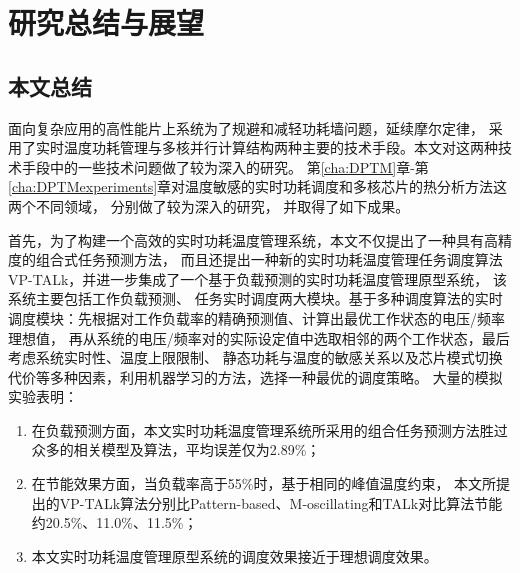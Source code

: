 

\chapter{研究总结与展望}
\label{cha:Conclusion}

\section{本文总结}
面向复杂应用的高性能片上系统为了规避和减轻功耗墙问题，延续摩尔定律， 采用了实时温度功耗管理与多核并行计算结构两种主要的技术手段。本文对这两种技术手段中的一些技术问题做了较为深入的研究。
第\ref{cha:DPTM}章-第\ref{cha:DPTMexperiments}章对温度敏感的实时功耗调度和多核芯片的热分析方法这两个不同领域， 分别做了较为深入的研究， 并取得了如下成果。

首先，为了构建一个高效的实时功耗温度管理系统，本文不仅提出了一种具有高精度的组合式任务预测方法， 而且还提出一种新的实时功耗温度管理任务调度算法VP-TALk，并进一步集成了一个基于负载预测的实时功耗温度管理原型系统， 该系统主要包括工作负载预测、 任务实时调度两大模块。基于多种调度算法的实时调度模块：先根据对工作负载率的精确预测值、计算出最优工作状态的电压/频率理想值， 再从系统的电压/频率对的实际设定值中选取相邻的两个工作状态，最后考虑系统实时性、温度上限限制、 静态功耗与温度的敏感关系以及芯片模式切换代价等多种因素，利用机器学习的方法，选择一种最优的调度策略。
大量的模拟实验表明：
\begin{enumerate}[1)]
\item 在负载预测方面，本文实时功耗温度管理系统所采用的组合任务预测方法胜过众多的相关模型及算法，平均误差仅为2.89\%；
\item 在节能效果方面，当负载率高于55\%时，基于相同的峰值温度约束， 本文所提出的VP-TALk算法分别比Pattern-based、M-oscillating和TALk对比算法节能约20.5\%、11.0\%、11.5\%；
\item 本文实时功耗温度管理原型系统的调度效果接近于理想调度效果。
\end{enumerate}

